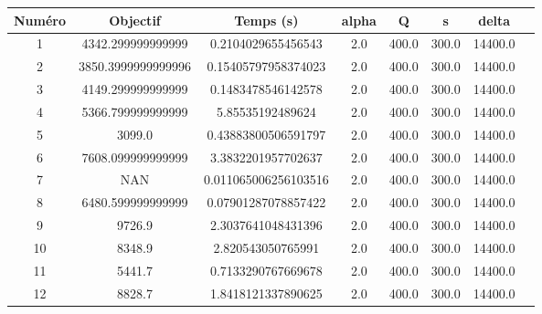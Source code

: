 \begin{tabular}{|c|c|c|c|c|c|c|c|}
\hline
 Numéro & Objectif & Temps (s) & alpha & Q & s & delta \\
\hline
1 & 4342.299999999999 & 0.2104029655456543 & 2.0 & 400.0 & 300.0 & 14400.0 \\ 
 \hline
2 & 3850.3999999999996 & 0.15405797958374023 & 2.0 & 400.0 & 300.0 & 14400.0 \\ 
 \hline
3 & 4149.299999999999 & 0.1483478546142578 & 2.0 & 400.0 & 300.0 & 14400.0 \\ 
 \hline
4 & 5366.799999999999 & 5.85535192489624 & 2.0 & 400.0 & 300.0 & 14400.0 \\ 
 \hline
5 & 3099.0 & 0.43883800506591797 & 2.0 & 400.0 & 300.0 & 14400.0 \\ 
 \hline
6 & 7608.099999999999 & 3.3832201957702637 & 2.0 & 400.0 & 300.0 & 14400.0 \\ 
 \hline
7 & NAN & 0.011065006256103516 & 2.0 & 400.0 & 300.0 & 14400.0 \\ 
 \hline
8 & 6480.599999999999 & 0.07901287078857422 & 2.0 & 400.0 & 300.0 & 14400.0 \\ 
 \hline
9 & 9726.9 & 2.3037641048431396 & 2.0 & 400.0 & 300.0 & 14400.0 \\ 
 \hline
10 & 8348.9 & 2.820543050765991 & 2.0 & 400.0 & 300.0 & 14400.0 \\ 
 \hline
11 & 5441.7 & 0.7133290767669678 & 2.0 & 400.0 & 300.0 & 14400.0 \\ 
 \hline
12 & 8828.7 & 1.8418121337890625 & 2.0 & 400.0 & 300.0 & 14400.0 \\ 
 \hline
\end{tabular}
